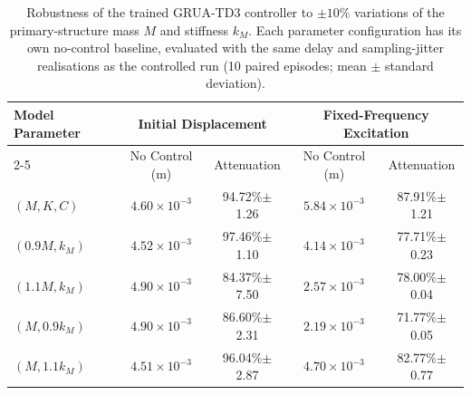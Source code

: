 \begin{table}[htbp]
\centering
\caption{Robustness of the trained GRUA-TD3 controller to $\pm10\%$ variations of the primary-structure mass $M$ and stiffness $k_M$. Each parameter configuration has its own no-control baseline, evaluated with the same delay and sampling-jitter realisations as the controlled run (10 paired episodes; mean $\pm$ standard deviation).}
\label{tab:robustness}
\small
\setlength{\tabcolsep}{3.4pt}
\begin{tabular}{lcccc}
\toprule
\multirow{2}{*}{Model Parameter} & \multicolumn{2}{c}{Initial Displacement} & \multicolumn{2}{c}{Fixed-Frequency Excitation} \\
\cline{2-5}
 & No Control (m) & Attenuation & No Control (m) & Attenuation \\
\midrule
$(M,K,C)$ & $4.60\times10^{-3}$ & 94.72\%$\pm$1.26 & $5.84\times10^{-3}$ & 87.91\%$\pm$1.21 \\
$(0.9M,k_M)$ & $4.52\times10^{-3}$ & 97.46\%$\pm$1.10 & $4.14\times10^{-3}$ & 77.71\%$\pm$0.23 \\
$(1.1M,k_M)$ & $4.90\times10^{-3}$ & 84.37\%$\pm$7.50 & $2.57\times10^{-3}$ & 78.00\%$\pm$0.04 \\
$(M,0.9k_M)$ & $4.90\times10^{-3}$ & 86.60\%$\pm$2.31 & $2.19\times10^{-3}$ & 71.77\%$\pm$0.05 \\
$(M,1.1k_M)$ & $4.51\times10^{-3}$ & 96.04\%$\pm$2.87 & $4.70\times10^{-3}$ & 82.77\%$\pm$0.77 \\
\bottomrule
\end{tabular}
\end{table}

